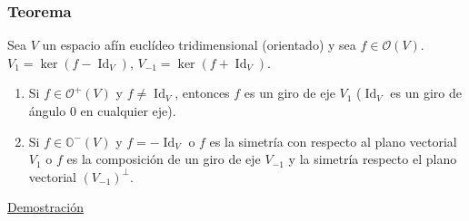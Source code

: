 \documentclass[12pt, a4paper, ones, notitlepage, openany,titlepage]{article}
\begin{document}
\subsubsection{Teorema}
Sea $V$ un espacio afín euclídeo tridimensional (orientado) y sea $f \in \mathcal{O}(V)$. $V_1 = \ker (f-\operatorname{Id}_V)$, $V_{-1} = \ker (f+\operatorname{Id}_V)$.
\begin{enumerate}[label=(\arabic*)]
	\item Si $f \in \mathcal{O}^+(V)$ y $f \neq \operatorname{Id}_V$, entonces $f$ es un giro de eje $V_1$ ($\operatorname{Id}_V$ es un giro de ángulo $0$ en cualquier eje).
	\item Si $f \in \mathbb{O}^-(V)$ y $f = -\operatorname{Id}_V$ o $f$ es la simetría con respecto al plano vectorial $V_1$ o $f$ es la composición de un giro de eje $V_{-1}$ y la simetría respecto el plano vectorial $(V_{-1})^\perp$.
\end{enumerate}
\noindent\underline{Demostración}
\end{document}

